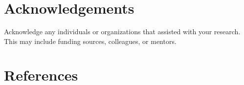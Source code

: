 \documentclass[a4paper, 15pt,usenatbib]{article}
\begin{document}
\section{Acknowledgements}
Acknowledge any individuals or organizations that assisted with your research. This may include funding sources, colleagues, or mentors.

\section{References}
%
%






\end{document}
